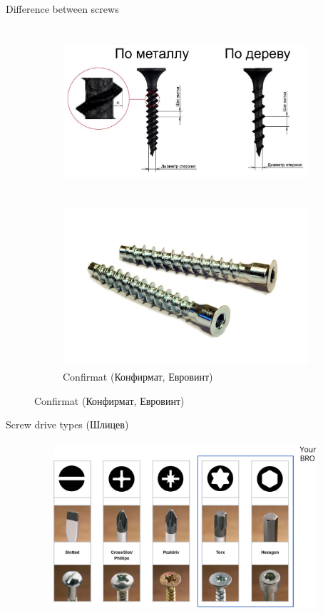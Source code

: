 \documentclass[aspectratio=169]{beamer}
\begin{document}
\begin{frame}[t]{Difference between screws}
    \framesubtitle{}
    \vspace{-0.6cm}

    \begin{figure}[H]
        \begin{subfigure}{0.64\textwidth}
            \centering\includegraphics[height=6cm,width=1\textwidth,keepaspectratio]{diff_btw_screws.jpg}
            \label{fig:diff_btw_screws.jpg}
        \end{subfigure}
        \begin{subfigure}{0.34\textwidth}
            \centering\includegraphics[height=6cm,width=1\textwidth,keepaspectratio]{komfirmat.jpg}
            \caption*{Confirmat (Конфирмат, Евровинт)}
            \label{fig:komfirmat.jpg}
        \end{subfigure}
    \end{figure}
\end{frame}


\begin{frame}[t]{Screw drive types (Шлицев)}
    \framesubtitle{}
    \vspace{-0.6cm}
    \begin{figure}[H]
        \centering\includegraphics[height=6cm,width=1\textwidth,keepaspectratio]{screw_drive_types.png}
        \label{fig:screw_drive_types.png}
    \end{figure}
\end{frame}
\end{document}

